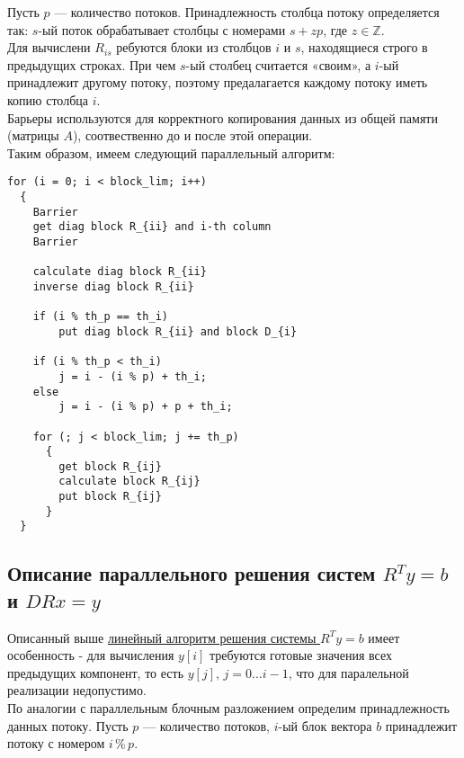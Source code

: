 \documentclass[a4paper,12pt]{article}
\begin{document}
    Пусть $p$ --- количество потоков. Принадлежность столбца потоку определяется так:
    $s$-ый поток обрабатывает столбцы с номерами $s + zp$, где $z \in \mathbb{Z}$. \\
    
    Для вычислени $R_{is}$ ребуются блоки из столбцов $i$ и $s$, находящиеся строго в предыдущих строках. При чем $s$-ый столбец считается «своим», а $i$-ый принадлежит 
    другому потоку, поэтому предалагается каждому потоку иметь копию столбца $i$. \\
    
    Барьеры используются для корректного копирования данных из общей памяти (матрицы $A$),
    соотвественно до и после этой операции. \\
    
    Таким образом, имеем 
    \hypertarget{paral_alg}{следующий параллельный алгоритм}: 

\begin{verbatim}
for (i = 0; i < block_lim; i++)
  {
    Barrier
    get diag block R_{ii} and i-th column
    Barrier
    
    calculate diag block R_{ii}
    inverse diag block R_{ii}
    
    if (i % th_p == th_i)
        put diag block R_{ii} and block D_{i}
        
    if (i % th_p < th_i)
        j = i - (i % p) + th_i;
    else
        j = i - (i % p) + p + th_i;
        
    for (; j < block_lim; j += th_p)
      {
        get block R_{ij}
        calculate block R_{ij}
        put block R_{ij}
      }
  }
\end{verbatim}


\subsection{Описание параллельного решения систем $R^T y = b$ и $DRx = y$}

    Описанный выше 
    \hyperlink{calc_y}{линейный алгоритм решения системы $R^T y = b$} 
    имеет особенность - для вычисления $y[i]$ 
    \hypertarget{reason}{требуются готовые значения всех предыдущих компонент}, 
    то есть $y[j],\, j = 0 \dots i-1$, что для паралельной реализации недопустимо. \\
    
    По аналогии с параллельным блочным разложением определим принадлежность данных потоку.
    Пусть $p$ --- количество потоков, $i$-ый блок вектора $b$ принадлежит потоку 
    с номером $i\,\%\, p$. \\
    
\end{document}
